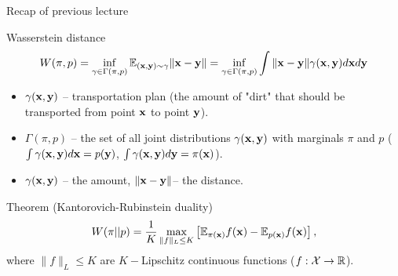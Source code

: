 

\begin{frame}
\titlepage
\end{frame}
\begin{frame}{Recap of previous lecture}
	\begin{block}{Wasserstein distance}
		\vspace{-0.5cm}
		\[
		W(\pi, p) = \inf_{\gamma \in \Gamma(\pi, p)} \mathbb{E}_{(\mathbf{x}, \mathbf{y}) \sim \gamma} \| \mathbf{x} - \mathbf{y} \| =  \inf_{\gamma \in \Gamma(\pi, p)} \int \| \mathbf{x} - \mathbf{y} \| \gamma (\mathbf{x}, \mathbf{y}) d \mathbf{x} d \mathbf{y}
		\]
		\vspace{-0.5cm}
		\begin{itemize}
			\item $\gamma(\mathbf{x}, \mathbf{y})$ -- transportation plan (the amount of "dirt" that should be transported from point $\mathbf{x}$ to point $\mathbf{y}$).
			\item $\Gamma(\pi, p)$ -- the set of all joint distributions $\gamma (\mathbf{x}, \mathbf{y})$ with marginals $\pi$ and $p$ ($\int \gamma(\mathbf{x}, \mathbf{y}) d \mathbf{x} = p(\mathbf{y})$, $\int \gamma(\mathbf{x}, \mathbf{y}) d \mathbf{y} = \pi(\mathbf{x})$).
			\item $\gamma(\mathbf{x}, \mathbf{y})$ -- the amount, $\|\mathbf{x} - \mathbf{y} \|$-- the distance.
		\end{itemize}
	\end{block}
	\begin{block}{Theorem (Kantorovich-Rubinstein duality)}
		\vspace{-0.2cm}
		\[
		W(\pi || p) = \frac{1}{K} \max_{\| f \|_L \leq K} \left[ \mathbb{E}_{\pi(\mathbf{x})} f(\mathbf{x})  - \mathbb{E}_{p(\mathbf{x})} f(\mathbf{x})\right],
		\]
		where $\| f \|_L \leq K$ are $K-$Lipschitz continuous functions ($f: \mathcal{X} \rightarrow \mathbb{R}$).
	\end{block}
\end{frame}
